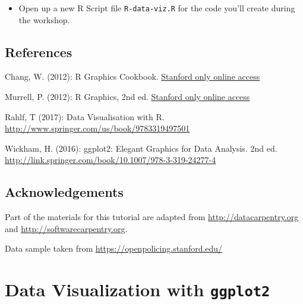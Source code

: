 \documentclass[]{book}
\providecommand{\tightlist}{%
  \setlength{\itemsep}{0pt}\setlength{\parskip}{0pt}}
\theoremstyle{definition}
\theoremstyle{definition}
\theoremstyle{definition}
\theoremstyle{remark}
\begin{document}
\begin{itemize}
\tightlist
\item
  Open up a new R Script file \texttt{R-data-viz.R} for the code you'll
  create during the workshop.
\end{itemize}

\section*{References}\label{references}

Chang, W. (2012): R Graphics Cookbook.
\href{https://stanford.idm.oclc.org/login?url=http://proquest.safaribooksonline.com/?uiCode=stanford\&xmlId=9781449363086}{Stanford
only online access}

Murrell, P. (2012): R Graphics, 2nd ed.
\href{https://stanford.idm.oclc.org/login?url=http://proquest.safaribooksonline.com/?uiCode=stanford\&xmlId=9781439831779}{Stanford
only online access}

Rahlf, T (2017): Data Visualisation with R.
\url{http://www.springer.com/us/book/9783319497501}

Wickham, H. (2016): ggplot2: Elegant Graphics for Data Analysis. 2nd ed.
\url{http://link.springer.com/book/10.1007/978-3-319-24277-4}

\section*{Acknowledgements}\label{acknowledgements}

Part of the materials for this tutorial are adapted from
\url{http://datacarpentry.org} and \url{http://softwarecarpentry.org}.

Data sample taken from \url{https://openpolicing.stanford.edu/}

\chapter{\texorpdfstring{Data Visualization with
\texttt{ggplot2}}{Data Visualization with ggplot2}}\label{data-visualization-with-ggplot2}
\end{document}
